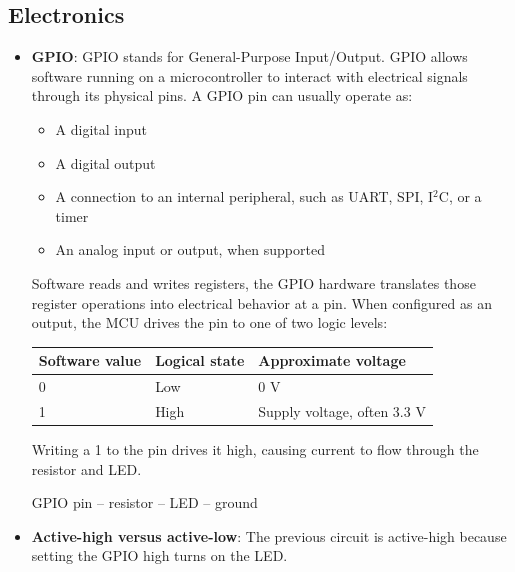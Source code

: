 \documentclass{report}
\begin{document}
    \subsection{Electronics}
    \begin{itemize}
        \item \textbf{GPIO}: GPIO stands for General-Purpose Input/Output. GPIO allows software running on a microcontroller to interact with electrical signals through its physical pins.
            \bigbreak \noindent 
            A GPIO pin can usually operate as:
            \begin{itemize}
                \item A digital input
                \item A digital output
                \item A connection to an internal peripheral, such as UART, SPI, I$^2$C, or a timer
                \item An analog input or output, when supported
            \end{itemize}
            Software reads and writes registers, the GPIO hardware translates those register operations into electrical behavior at a pin.
            \bigbreak \noindent 
            When configured as an output, the MCU drives the pin to one of two logic levels:
            \begin{center}
                \begin{tabularx}{\textwidth}{@{}XXX@{}}
                    \toprule
                    \textbf{Software value}&	\textbf{Logical state}&	\textbf{Approximate voltage} \\
                    \midrule
                    0	&Low	&0 V \\[2ex]
                    1	&High	&Supply voltage, often 3.3 V \\
                    \bottomrule
                \end{tabularx}
            \end{center}
            Writing a 1 to the pin drives it high, causing current to flow through the resistor and LED.
            \begin{center}
                GPIO pin -- resistor -- LED -- ground
            \end{center}
        \item \textbf{Active-high versus active-low}: The previous circuit is active-high because setting the GPIO high turns on the LED.
            \begin{center}

\end{center}
\end{itemize}
\end{document}
